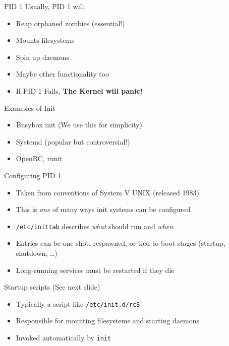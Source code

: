 \documentclass{../lecture}
\begin{document}
\begin{frame}{PID 1}
  Usually, PID 1 will:
  \begin{itemize}
    \item Reap orphaned zombies (essential!)
    \item Mounts filesystems
    \item Spin up daemons
    \item Maybe other functionality too
    \item If PID 1 Fails, \textbf{The Kernel will panic!}
  \end{itemize}
  \begin{exampleblock}{Examples of Init}
    \begin{itemize}
      \item Busybox init (We use this for simplicity)
      \item Systemd (popular but controversial!)
      \item OpenRC, runit
    \end{itemize}
  \end{exampleblock}
\end{frame}

\begin{frame}{Configuring PID 1}
  \begin{itemize}
    \item Taken from conventions of System V UNIX (released 1983)
    \item This is \textit{one} of many ways init systems can be configured
    \item \texttt{/etc/inittab} describes \emph{what} should run and \emph{when}
    \item Entries can be one-shot, respawned, or tied to boot stages (startup,
      shutdown, \dots)
    \item Long-running services must be restarted if they die
  \end{itemize}
  \begin{exampleblock}{Startup scripts (See next slide)}
    \begin{itemize}
      \item Typically a script like \texttt{/etc/init.d/rcS}
      \item Responsible for mounting filesystems and starting daemons
      \item Invoked automatically by \texttt{init}
    \end{itemize}
  \end{exampleblock}
\end{frame}
\end{document}
